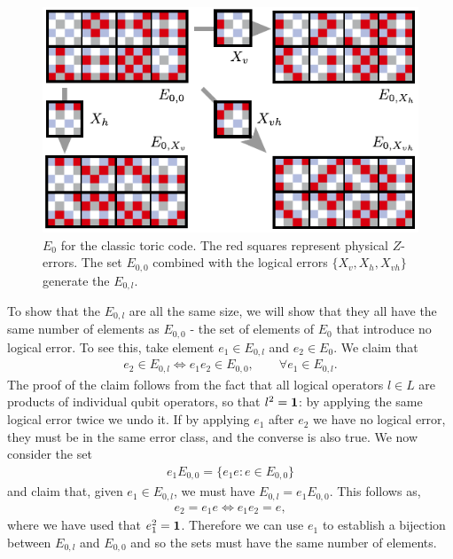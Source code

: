 \begin{figure}[htb]
  \begin{center}
    \includegraphics{figures/e_0.pdf}
  \end{center}
  \caption{$E_0$ for the classic toric code. The red squares represent physical $Z$-errors. The set $E_{0,0}$ combined with the logical errors $\{X_v, X_h, X_{vh}\}$ generate the $E_{0, l}$.}
  \label{e_0}
\end{figure}

To show that the $E_{0, l}$ are all the same size, we will show that they all have the same number of elements as $E_{0,0}$ - the set of elements of $E_0$ that introduce no logical error. To see this, take element $e_1 \in E_{0, l}$ and $e_2 \in E_0$. We claim that
\begin{align}
  e_2 \in E_{0, l} \Leftrightarrow e_1 e_2 \in E_{0,0}, \qquad \forall e_1 \in E_{0,l}.
\end{align}
The proof of the claim follows from the fact that all logical operators $l\in L$ are products of individual qubit operators, so that $l^2 = \mathbf{1}$: by applying the same logical error twice we undo it. If by applying $e_1$ after $e_2$ we have no logical error, they must be in the same error class, and the converse is also true. We now consider the set
\begin{align}
  e_1 E_{0,0} = \{e_1 e : e \in E_{0,0}\}
\end{align}
and claim that, given $e_1 \in E_{0,l}$, we must have $E_{0, l} = e_1 E_{0,0}$. This follows as, 
\begin{align}
  e_2 =  e_1 e \Leftrightarrow e_1 e_2 = e,
\end{align}
where we have used that $e_1^2 = \mathbf{1}$. Therefore we can use $e_1$ to establish a bijection between $E_{0,l}$ and $E_{0,0}$ and so the sets must have the same number of elements.

